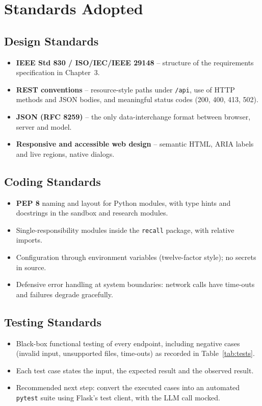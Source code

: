 \chapter{Standards Adopted}

\section{Design Standards}
\begin{itemize}
\item \textbf{IEEE Std 830 / ISO/IEC/IEEE 29148} -- structure of the requirements specification in Chapter~3.
\item \textbf{REST conventions} -- resource-style paths under \texttt{/api}, use of HTTP methods and JSON bodies, and meaningful status codes (200, 400, 413, 502).
\item \textbf{JSON (RFC 8259)} -- the only data-interchange format between browser, server and model.
\item \textbf{Responsive and accessible web design} -- semantic HTML, ARIA labels and live regions, native dialogs.
\end{itemize}

\section{Coding Standards}
\begin{itemize}
\item \textbf{PEP 8} naming and layout for Python modules, with type hints and docstrings in the sandbox and research modules.
\item Single-responsibility modules inside the \texttt{recall} package, with relative imports.
\item Configuration through environment variables (twelve-factor style); no secrets in source.
\item Defensive error handling at system boundaries: network calls have time-outs and failures degrade gracefully.
\end{itemize}

\section{Testing Standards}
\begin{itemize}
\item Black-box functional testing of every endpoint, including negative cases (invalid input, unsupported files, time-outs) as recorded in Table~\ref{tab:tests}.
\item Each test case states the input, the expected result and the observed result.
\item Recommended next step: convert the executed cases into an automated \texttt{pytest} suite using Flask's test client, with the LLM call mocked.
\end{itemize}
